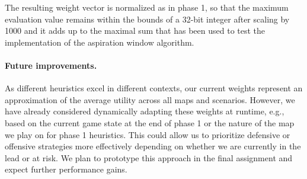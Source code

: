 The resulting weight vector is normalized as in phase 1, so that the maximum evaluation value remains within the bounds of a 32-bit integer after scaling by 1000 and it adds up to the maximal sum that has been used to test the implementation of the aspiration window algorithm.

\paragraph{Future improvements.}
As different heuristics excel in different contexts, our current weights represent an approximation of the average utility across all maps and scenarios. However, we have already considered dynamically adapting these weights at runtime, e.g., based on the current game state at the end of phase 1 or the nature of the map we play on for phase 1 heuristics. This could allow us to prioritize defensive or offensive strategies more effectively depending on whether we are currently in the lead or at risk. We plan to prototype this approach in the final assignment and expect further performance gains.


